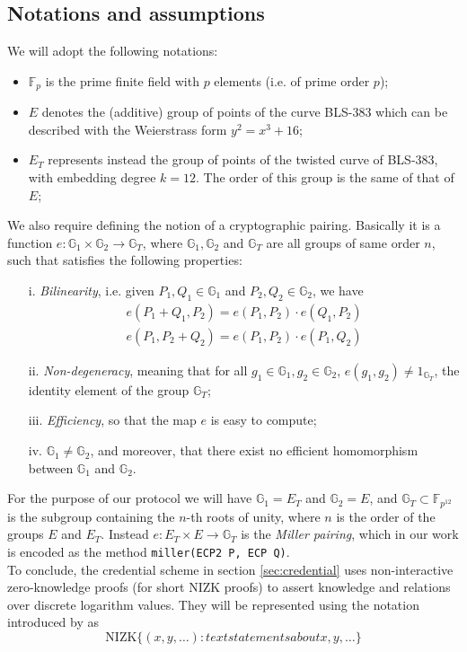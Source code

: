 \documentclass[twocolumn]{article}
\begin{document}
\subsection*{Notations and assumptions}

We will adopt the following notations:
\begin{itemize}
    \item $\mathbb{F}_p$ is the prime finite field with $p$ elements (i.e. of prime order $p$); %
    \item $E$ denotes the (additive) group of points of the curve BLS-383 \citep{bls383} which can be described with the Weierstrass form  $y^2=x^3 + 16$; 
    \item $E_T$ represents instead the group of points of the twisted curve of BLS-383, with embedding degree $k=12$. The order of this group is the same of that of $E$;
\end{itemize}
We also require defining the notion of a cryptographic pairing. Basically it is a function $e: \mathbb{G}_1\times\mathbb{G}_2\to \mathbb{G}_T$, where $\mathbb{G}_1,\mathbb{G}_2$ and $\mathbb{G}_T$ are all groups of same order $n$, such that satisfies the following properties:
\begin{itemize}
    \item [i.] \emph{Bilinearity}, i.e. given $P_1,Q_1\in\mathbb{G}_1$ and $P_2,Q_2\in\mathbb{G}_2$, we have 
    \begin{align*}
        e(P_1+Q_1,P_2) = e(P_1,P_2)\cdot e(Q_1,P_2) \\
        e(P_1,P_2+Q_2) = e(P_1,P_2)\cdot e(P_1,Q_2)
    \end{align*}
    \item[ii.] \emph{Non-degeneracy}, meaning that for all $g_1\in\mathbb{G}_1, g_2\in\mathbb{G}_2$, $e(g_1,g_2)\ne 1_{\mathbb{G}_T}$, the identity element of the group $\mathbb{G}_T$;
    \item[iii.] \emph{ Efficiency}, so that the map $e$ is easy to compute;
    \item[iv. ] $\mathbb{G}_1\ne \mathbb{G}_2$, and moreover, that there exist no efficient homomorphism between $\mathbb{G}_1$ and $\mathbb{G}_2$.
\end{itemize}
For the purpose of our protocol we will have $\mathbb{G}_1 = E_T$ and $\mathbb{G}_2 = E$, and $\mathbb{G}_T\subset \mathbb{F}_{p^{12}}$ is the subgroup containing the $n$-th roots of unity, where $n$ is the order of the groups $E$ and $E_T$. Instead $e: E_T  \times E\to \mathbb{G}_T$ is the \emph{Miller pairing}, which in our work is encoded as the method \verb!miller(ECP2 P, ECP Q)!. \\
To conclude, the credential scheme in section \ref{sec:credential} uses non-interactive zero-knowledge proofs (for short NIZK proofs) to assert knowledge and relations over discrete logarithm values. They will be represented using the notation introduced by \cite{camenisch} as 
\[
\text{NIZK}\{(x,y,\dots): text{statements about x, y,}\dots \}
\]
\end{document}
